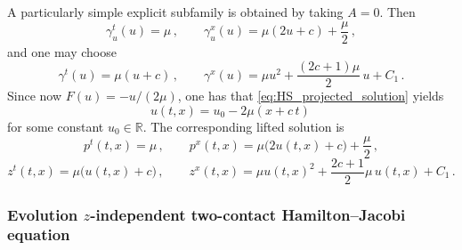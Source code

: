 \documentclass[11pt,twoside]{article}
\theoremstyle{plain}
\theoremstyle{definition}
\theoremstyle{remark}
\begin{document}
A particularly simple explicit subfamily is obtained by taking $A=0$. Then
\[
\gamma_u^t(u)=\mu\,,\qquad
\gamma_u^x(u)=\mu(2u+c)+\frac{\mu}{2}\,,
\]
and one may choose
\begin{equation}\label{eq:HS_standard_explicit_S}
\gamma^t(u)=\mu(u+c)\,,\qquad
\gamma^x(u)=\mu u^2+\frac{(2c+1)\mu}{2}\,u+C_1\,.
\end{equation}
Since now $F(u)=-u/(2\mu)$, one has that \eqref{eq:HS_projected_solution} yields
\begin{equation}\label{eq:HS_standard_explicit_u}
u(t,x)=u_0-2\mu (x+c\,t)\,
\end{equation}
for some constant $u_0\in\mathbb R$. The corresponding lifted solution is
\[
p^t(t,x)=\mu\,,\qquad
p^x(t,x)=\mu\bigl(2u(t,x)+c\bigr)+\frac{\mu}{2}\,,
\]
\[
z^t(t,x)=\mu\bigl(u(t,x)+c\bigr)\,,\qquad
z^x(t,x)=\mu u(t,x)^2+\frac{2c+1}{2}\mu\,u(t,x)+C_1\,.
\]

\subsubsection{Evolution $z$-independent two-contact Hamilton--Jacobi equation}
\end{document}
